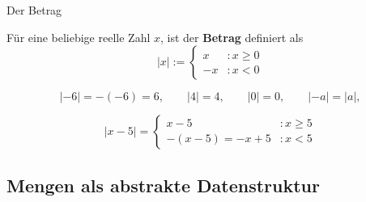 \documentclass[12pt,ngerman,a4paper,ignorenonframetext,]{beamer}
\begin{document}
\begin{frame}{Der Betrag}
\protect\hypertarget{der-betrag}{}


\begin{definition}

Für eine beliebige reelle Zahl \(x\), ist der \textbf{Betrag} definiert
als \begin{equation*}
        |x| := \begin{cases}
                    x   &: x \geq 0 \\
                    -x  &: x < 0
                \end{cases}
\end{equation*}

\end{definition}


\begin{Beispiele}[]

\begin{equation*}
        |-6|      = -(-6)     = 6,   \qquad 
        |4|       = 4,    \qquad 
        |0|       = 0,    \qquad 
        |-a|      = |a|,
\end{equation*}

\begin{equation*}
    | x-5 | =   \begin{cases}
                    x-5             &: x \geq 5 \\
                    -(x-5)=-x+5     &: x < 5
                \end{cases}
\end{equation*}

\end{Beispiele}

\end{frame}

\hypertarget{mengen-als-abstrakte-datenstruktur}{%
\subsection{Mengen als abstrakte
Datenstruktur}\label{mengen-als-abstrakte-datenstruktur}}
\end{document}
